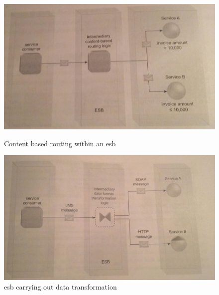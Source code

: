 \documentclass[12pt]{article}
\begin{document}
\begin{figure}[here!]
\centering
\begin{minipage}[h]{0.46\textwidth}
\centering
  \includegraphics[width=1.0\textwidth]{images/content}
	   \caption{Content based routing within an \gls{esb} \cite[page 394]{grau}}
    \label{fig:content}
\end{minipage}
\begin{minipage}[h]{0.05\textwidth}
\vfill
\end{minipage}
\begin{minipage}[h]{0.46\textwidth}
\centering
\includegraphics[width=1.0\textwidth]{images/page395}
	\caption{\gls{esb} carrying out data transformation \cite[page 395]{grau}}
\label{fig:Datafromtrans}
\end{minipage}
\end{figure}	
	
	
	
	
\end{document}
